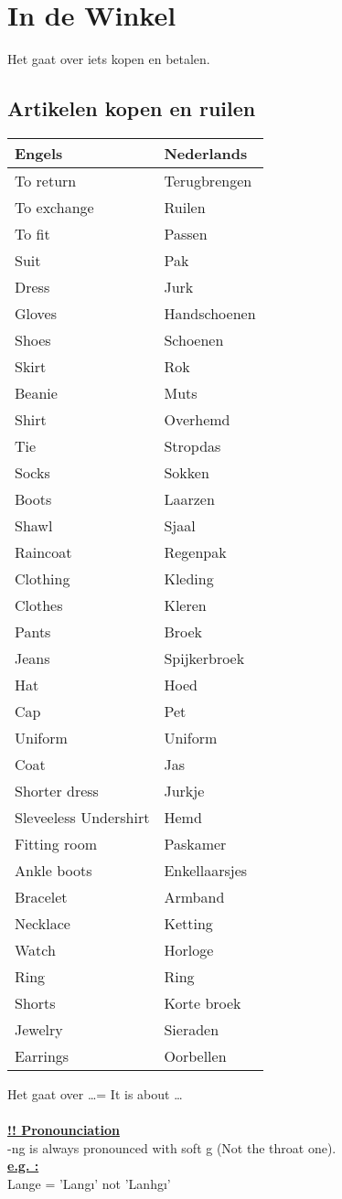 \documentclass[a4paper,14pt]{extarticle}
\newcommand{\attention}[1]{\underline{\textbf{!! #1}}}
\newcommand{\emp}[1]{\underline{\textbf{#1}}}
\begin{document}
\section{In de Winkel}
Het gaat over iets kopen en betalen.
\subsection{Artikelen kopen en ruilen}
\begin{paracol}{2}
\begin{tabularx}{200pt}{ p{100pt} p{100pt} }
 \hline
 Engels & Nederlands \\
 \hline
 To return & Terugbrengen \\
 To exchange & Ruilen \\
 To fit & Passen \\
 Suit & Pak \\
 Dress & Jurk \\
 Gloves & Handschoenen \\
 Shoes & Schoenen \\
 Skirt & Rok \\
 Beanie & Muts \\
 Shirt & Overhemd \\
 Tie & Stropdas \\
 Socks & Sokken \\
 Boots & Laarzen \\
 Shawl & Sjaal \\
 Raincoat & Regenpak \\
 Clothing & Kleding \\
 Clothes & Kleren \\
 Pants & Broek \\
 Jeans & Spijkerbroek \\
 Hat & Hoed \\
 Cap & Pet \\
 Uniform & Uniform \\
 Coat & Jas \\
 Shorter dress & Jurkje \\
 Sleveeless Undershirt & Hemd \\
 Fitting room & Paskamer \\
 Ankle boots & Enkellaarsjes \\
 Bracelet & Armband \\
 Necklace & Ketting \\
 Watch & Horloge \\
 Ring & Ring \\
 Shorts & Korte broek \\
 Jewelry & Sieraden \\
 Earrings & Oorbellen \\
\end{tabularx}
    \switchcolumn
Het gaat over \dots = It is about \dots \\ \\
\attention{Pronounciation} \\
-ng is always pronounced with soft g (Not the throat one). \\
\emp{e.g. :} \\
Lange = 'Langı' not 'Lanhgı' \\
\end{paracol}
\newpage
\end{document}
